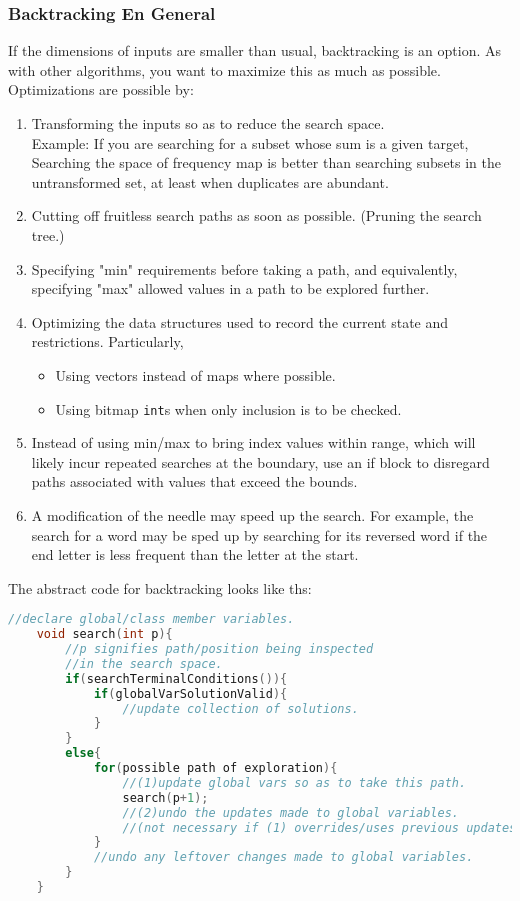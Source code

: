 \documentclass{article}
\begin{document}
\subsubsection*{Backtracking En General}
If the dimensions of inputs are smaller than usual, backtracking is an option.
As with other algorithms, you want to maximize this as much as possible. Optimizations
are possible by:
\begin{enumerate}
    \item Transforming the inputs so as to reduce the search space.\\
    Example: If you are searching for a subset whose sum is a given target,
    Searching the space of frequency map is better than searching subsets in the
    untransformed set, at least when duplicates are abundant.
    \item Cutting off fruitless search paths as soon as possible. (Pruning the search tree.)
    \item Specifying "min" requirements before taking a path, and equivalently, specifying "max" allowed values in a path to be explored further.
    \item Optimizing the data structures used to record the current state and restrictions. Particularly,
    \begin{itemize}
        \item Using vectors instead of maps where possible.
        \item Using bitmap \texttt{int}s when only inclusion is to be checked.
    \end{itemize}
    \item Instead of using min/max to bring index values within range, which will likely incur repeated
    searches at the boundary, use an if block to disregard paths associated with values
    that exceed the bounds.
    \item A modification of the needle may speed up the search. For example, the search for a word
    may be sped up by searching for its reversed word if the end letter is less frequent than the letter at
    the start.
    
\end{enumerate}
The abstract code for backtracking looks like ths:
\begin{lstlisting}[language=C++]
    //declare global/class member variables.
    void search(int p){
        //p signifies path/position being inspected
        //in the search space.
        if(searchTerminalConditions()){
            if(globalVarSolutionValid){
                //update collection of solutions.
            }
        }
        else{
            for(possible path of exploration){
                //(1)update global vars so as to take this path.
                search(p+1);
                //(2)undo the updates made to global variables.
                //(not necessary if (1) overrides/uses previous updates.)
            }
            //undo any leftover changes made to global variables.
        }
    }
\end{lstlisting}
\end{document}

